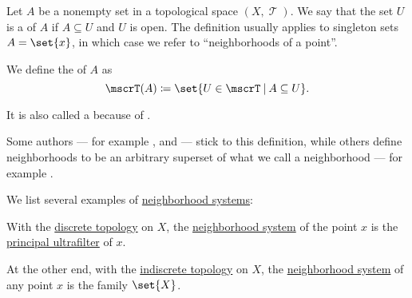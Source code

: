 \begin{definition}\label{def:neighborhood_system}
  Let \( A \) be a nonempty set in a topological space \( (X, \mscrT) \). We say that the set \( U \) is a  of \( A \) if \( A \subseteq U \) and \( U \) is open. The definition usually applies to singleton sets \( A = \set{ x } \), in which case we refer to \enquote{neighborhoods of a point}.

  We define the  of \( A \) as
  \begin{equation*}
    \mscrT(A) \coloneqq \set{ U \in \mscrT \given A \subseteq U }.
  \end{equation*}

  It is also called a  because of .
\end{definition}
\begin{comments}
  \item Some authors --- for example \cite[12]{Engelking1989}, \cite[7]{Rudin1991Functional} and \cite[def. 10.2]{ИвановТужилин2017} --- stick to this definition, while others define neighborhoods to be an arbitrary superset of what we call a neighborhood --- for example \cite[8]{Kelley1975}.
\end{comments}

\begin{example}\label{ex:def:neighborhood_system}
  We list several examples of \hyperref[def:neighborhood_system]{neighborhood systems}:
  \begin{thmenum}
     With the \hyperref[def:discrete_topology]{discrete topology} on \( X \), the \hyperref[def:neighborhood_system]{neighborhood system} of the point \( x \) is the \hyperref[ex:principal_ultrafilter]{principal ultrafilter} of \( x \).

     At the other end, with the \hyperref[def:indiscrete_topology]{indiscrete topology} on \( X \), the \hyperref[def:neighborhood_system]{neighborhood system} of any point \( x \) is the family \( \set{ X } \).
  \end{thmenum}
\end{example}

